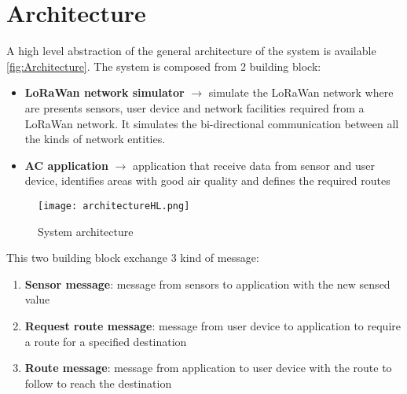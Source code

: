 \chapter{Architecture}
A high level abstraction of the general architecture of the system is available \autoref{fig:Architecture}.
The system is composed from 2 building block:
\begin{itemize}
    \item \textbf{LoRaWan network simulator} $\rightarrow$ simulate the LoRaWan network where are presents sensors, user device and network facilities required from a LoRaWan network. It simulates the bi-directional communication between all the kinds of network entities.
    \item \textbf{AC application} $\rightarrow$ application that receive data from sensor and user device, identifies areas with good air quality and defines the required routes
\end{itemize}

\begin{figure}[h]
    \centering
    \texttt{[image: architectureHL.png]}
    \caption{System architecture}
    \label{fig:Architecture}
\end{figure}

This two building block exchange 3 kind of message:
\begin{enumerate}
    \item \textbf{Sensor message}: message from sensors to application with the new sensed value
    \item \textbf{Request route message}: message from user device to application to require a route for a specified destination
    \item \textbf{Route message}: message from application to user device with the route to follow to reach the destination
\end{enumerate}

